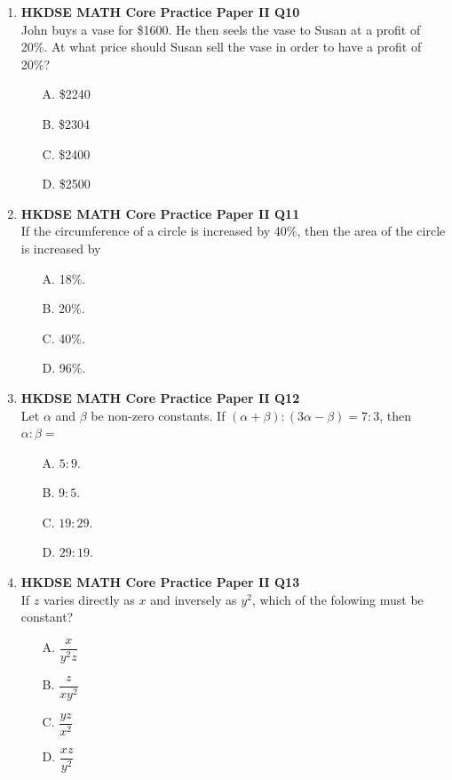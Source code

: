 \documentclass[12pt]{article}
\begin{document}
\begin{enumerate}
	\item \textbf{HKDSE MATH Core Practice Paper II Q10}\\
	John buys a vase for \$1600. He then seels the vase to Susan at a profit of 20\%. At what price should Susan sell the vase in order to have a profit of 20\%?
	\begin{enumerate}
		\item[A.] \$2240
		\item[B.] \$2304
		\item[C.] \$2400
		\item[D.] \$2500
	\end{enumerate}

	\item \textbf{HKDSE MATH Core Practice Paper II Q11}\\
	If the circumference of a circle is increased by 40\%, then the area of the circle is increased by	
	\begin{enumerate}
		\item[A.] 18\%.
		\item[B.] 20\%.
		\item[C.] 40\%.
		\item[D.] 96\%.
	\end{enumerate}

	\item \textbf{HKDSE MATH Core Practice Paper II Q12}\\
	Let $\alpha$ and $\beta$ be non-zero constants. If $(\alpha + \beta) : (3\alpha - \beta) = 7 : 3$, then $\alpha : \beta = $
	\begin{enumerate}
		\item[A.] $5 : 9$.
		\item[B.] $9 : 5$.
		\item[C.] $19 : 29$.
		\item[D.] $29 : 19$.
	\end{enumerate}

	\item \textbf{HKDSE MATH Core Practice Paper II Q13}\\
	If $z$ varies directly as $x$ and inversely as $y^2$, which of the folowing must be constant?
	\begin{enumerate}
		\item[A.] $\dfrac{x}{y^2z}$
		\item[B.] $\dfrac{z}{xy^2}$
		\item[C.] $\dfrac{yz}{x^2}$
		\item[D.] $\dfrac{xz}{y^2}$
	\end{enumerate}


\end{enumerate}
\end{document}
